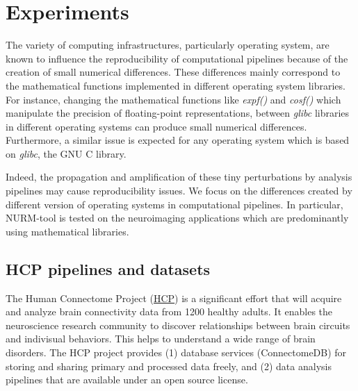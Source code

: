\documentclass[a4paper,num-refs]{oup-contemporary}
\begin{document}
\section{Experiments}

The variety of computing infrastructures, particularly operating system, are 
known to influence the reproducibility of computational pipelines because of the
creation of small numerical differences. 
These differences mainly correspond to the mathematical functions implemented 
in different operating system libraries.
For instance, changing the mathematical functions like \emph{expf()} and 
\emph{cosf()} which manipulate the precision of floating-point representations, 
between \emph{glibc} libraries in different operating systems can produce 
small numerical differences.
Furthermore, a similar issue is expected for any operating system which is 
based on \emph{glibc}, the GNU C library.

Indeed, the propagation and amplification of these tiny perturbations by analysis 
pipelines may cause reproducibility issues. We focus on the differences 
created by different version of operating systems in computational pipelines. 
In particular, NURM-tool is tested on the neuroimaging applications which are 
predominantly using mathematical libraries.

\subsection{HCP pipelines and datasets}

The Human Connectome Project (\href{https://www.humanconnectome.org}{HCP}) 
is a significant effort that will acquire and analyze brain connectivity 
data from 1200 healthy adults.
It enables the neuroscience 
research community to discover relationships between brain circuits and 
indivisual behaviors. This helps to understand a wide range of brain disorders.
The HCP project provides (1) database services (ConnectomeDB) for storing and 
sharing primary and processed data freely, and (2) data analysis pipelines that 
are available under an open source license.
\end{document}
